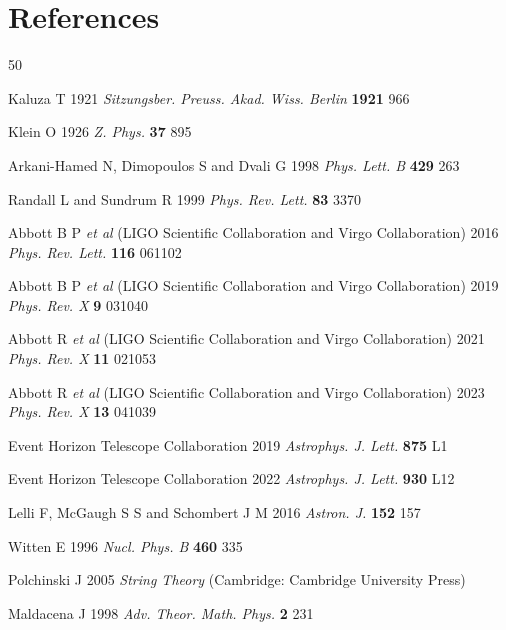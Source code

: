 \documentclass[12pt]{iopart}
\begin{document}
\section*{References}
\providecommand{\newblock}{}
\begin{thebibliography}{50}

Kaluza T 1921 \textit{Sitzungsber. Preuss. Akad. Wiss. Berlin} \textbf{1921} 966

Klein O 1926 \textit{Z. Phys.} \textbf{37} 895

Arkani-Hamed N, Dimopoulos S and Dvali G 1998 \textit{Phys. Lett. B} \textbf{429} 263

Randall L and Sundrum R 1999 \textit{Phys. Rev. Lett.} \textbf{83} 3370

Abbott B P \textit{et al} (LIGO Scientific Collaboration and Virgo Collaboration) 2016 \textit{Phys. Rev. Lett.} \textbf{116} 061102

Abbott B P \textit{et al} (LIGO Scientific Collaboration and Virgo Collaboration) 2019 \textit{Phys. Rev. X} \textbf{9} 031040

Abbott R \textit{et al} (LIGO Scientific Collaboration and Virgo Collaboration) 2021 \textit{Phys. Rev. X} \textbf{11} 021053

Abbott R \textit{et al} (LIGO Scientific Collaboration and Virgo Collaboration) 2023 \textit{Phys. Rev. X} \textbf{13} 041039

Event Horizon Telescope Collaboration 2019 \textit{Astrophys. J. Lett.} \textbf{875} L1

Event Horizon Telescope Collaboration 2022 \textit{Astrophys. J. Lett.} \textbf{930} L12

Lelli F, McGaugh S S and Schombert J M 2016 \textit{Astron. J.} \textbf{152} 157


Witten E 1996 \textit{Nucl. Phys. B} \textbf{460} 335

Polchinski J 2005 \textit{String Theory} (Cambridge: Cambridge University Press)

Maldacena J 1998 \textit{Adv. Theor. Math. Phys.} \textbf{2} 231

\end{thebibliography}
\end{document}
